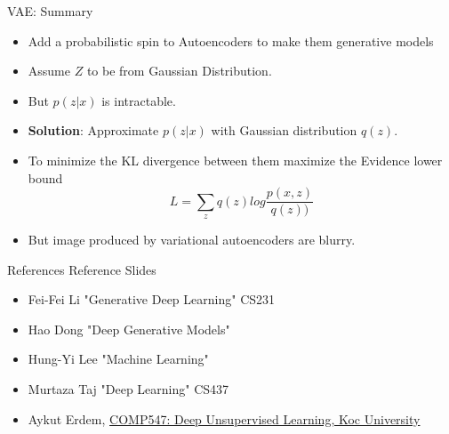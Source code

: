 \begin{frame}{VAE: Summary}
\begin{itemize}
    \item Add a probabilistic spin to Autoencoders to make them generative models
    \item Assume $Z$ to be from Gaussian Distribution.
    \item But $p(z|x)$ is intractable.
    \item \textbf{Solution}: Approximate $p(z|x)$ with Gaussian distribution $q(z)$.
    \item To minimize the KL divergence between them maximize the Evidence lower bound 
    $$L = \sum_z q(z) log \frac{p(x,z)}{q(z))}$$
    \item But image produced by variational autoencoders are blurry.
\end{itemize}
    
\end{frame}


\begin{frame}{References}
Reference Slides
\begin{itemize}
    \item Fei-Fei Li "Generative Deep Learning" CS231
    \item Hao Dong "Deep Generative Models" 
    \item Hung-Yi Lee "Machine Learning" 
    \item Murtaza Taj "Deep Learning" CS437
    \item Aykut Erdem, \href{https://aykuterdem.github.io/classes/comp547.s24/}{COMP547: Deep Unsupervised Learning, Koc University}

\end{itemize}
    
\end{frame}